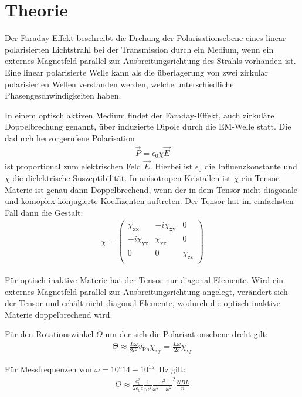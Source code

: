 \section{Theorie}
\label{sec:Theorie}

Der Faraday-Effekt beschreibt die Drehung der Polarisationsebene eines linear
polarisierten Lichtstrahl bei der Transmission durch ein Medium, wenn ein
externes Magnetfeld parallel zur Ausbreitungsrichtung des Strahls vorhanden
ist. Eine linear polarisierte Welle kann als die überlagerung von zwei
zirkular polarisierten Wellen verstanden werden, welche unterschiedliche
Phasengeschwindigkeiten haben.

In einem optisch aktiven Medium findet der Faraday-Effekt, auch zirkuläre Doppelbrechung genannt, über induzierte
Dipole durch die EM-Welle statt. Die dadurch hervorgerufene Polarisation
\begin{align}
  \vec{P} = \epsilon_0 \chi \vec{E}
\end{align}
ist proportional zum elektrischen Feld $\vec{E}$. Hierbei ist $\epsilon_0$ die
Influenzkonstante und $\chi $ die dielektrische Suszeptibilität. In anisotropen
Kristallen ist $\chi$ ein Tensor. Materie ist genau dann Doppelbrechend, wenn der in dem
Tensor nicht-diagonale und komoplex konjugierte Koeffizenten auftreten. Der Tensor
hat im einfachsten Fall dann die Gestalt:
\begin{align}
  \chi =
  \left( \begin{matrix}
         \chi_{\mathrm{xx}} & -i \chi_{\mathrm{xy}} & 0 \\
         -i \chi_{\mathrm{yx}} & \chi_{\mathrm{xx}} & 0 \\
         0 & 0 & \chi_{\mathrm{zz}}  \\
  \end{matrix} \right)
\end{align}

Für optisch inaktive Materie hat der Tensor nur diagonal Elemente. Wird ein
externes Magnetfeld parallel zur Ausbreitungsrichtung angelegt, verändert sich der Tensor und erhält
nicht-diagonal Elemente, wodurch die optisch inaktive Materie doppelbrechend wird.

Für den Rotationswinkel $\Theta$ um der sich die Polarisationsebene dreht gilt:
\begin{align}
  \Theta \approx \frac{L \omega}{2 c^2}v_{\mathrm{Ph}} \chi_{\mathrm{xy}} = \frac{L \omega}{2 c}\chi_{\mathrm{xy}}
\end{align}

Für Messfrequenzen von $\omega = 10°{14}-10^{15}$\, Hz gilt:
\begin{align}
  \Theta \approx \frac{e^3_0}{2 \epsilon_0 c} \frac{1}{m^2}\frac{\omega^2}{\omega^2_0 - \omega^2}^2 \frac{NBL}{n}
\end{align}



